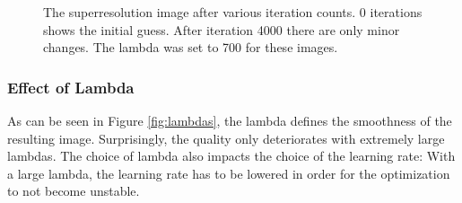 \documentclass{paper}
\begin{document}
\begin{figure}[ht!]
\caption{The superresolution image after various iteration counts.
0 iterations shows the initial guess. After iteration 4000 there are only
minor changes. The lambda was set to 700 for these images.}
\label{fig:iteration_count}
\end{figure}

\subsubsection*{Effect of Lambda}
As can be seen in Figure \ref{fig:lambdas}, the lambda defines the smoothness
of the resulting image. 
Surprisingly, 
the quality only deteriorates with extremely large lambdas. 
The choice of lambda also impacts the choice of the learning rate: 
With a large lambda, the learning rate has to be lowered in order for the
optimization to not become unstable.
\end{document}
